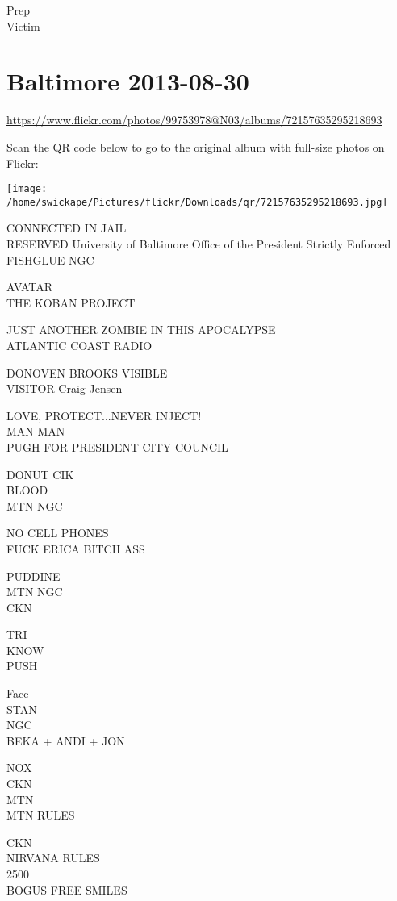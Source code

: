 \documentclass[10pt,letterpaper]{article}
\begin{document}
Prep\\
Victim
\pagebreak

\section*{Baltimore 2013-08-30}

\url{https://www.flickr.com/photos/99753978@N03/albums/72157635295218693}

Scan the QR code below to go to the original album with full-size photos on Flickr:

\texttt{[image: /home/swickape/Pictures/flickr/Downloads/qr/72157635295218693.jpg]}
\pagebreak

CONNECTED IN JAIL\\
RESERVED University of Baltimore Office of the President Strictly Enforced FISHGLUE NGC

AVATAR\\
THE KOBAN PROJECT

JUST ANOTHER ZOMBIE IN THIS APOCALYPSE\\
ATLANTIC COAST RADIO

DONOVEN BROOKS VISIBLE\\
VISITOR Craig Jensen

LOVE, PROTECT...NEVER INJECT!\\
MAN MAN\\
PUGH FOR PRESIDENT CITY COUNCIL

DONUT CIK\\
BLOOD\\
MTN NGC

NO CELL PHONES\\
FUCK ERICA BITCH ASS

PUDDINE\\
MTN NGC\\
CKN

TRI\\
KNOW\\
PUSH

Face\\
STAN\\
NGC\\
BEKA + ANDI + JON

NOX\\
CKN\\
MTN\\
MTN RULES

CKN\\
NIRVANA RULES\\
2500\\
BOGUS FREE SMILES
\end{document}
